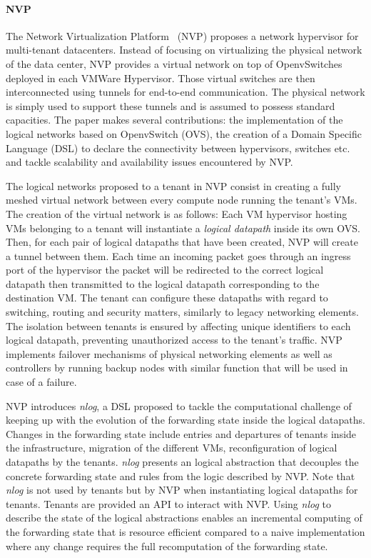 \paragraph{NVP}
The Network Virtualization Platform~\cite{NVP-Koponen2014} (NVP) proposes a network hypervisor for multi-tenant datacenters. Instead of focusing on virtualizing the physical network of the data center, NVP provides a virtual network on top of OpenvSwitches~\cite{openvswitch} deployed in each VMWare Hypervisor. Those virtual switches are then interconnected using tunnels for end-to-end communication. 
The physical network is simply used to support these tunnels and is assumed to possess standard capacities.
The paper makes several contributions: the implementation of the logical networks based on OpenvSwitch (OVS), the creation of a Domain Specific Language (DSL) to declare the connectivity between hypervisors, switches etc. and tackle scalability and availability issues encountered by NVP.

The logical networks proposed to a tenant in NVP consist in creating a fully meshed virtual network between every compute node running the tenant's VMs.
The creation of the virtual network is as follows:
Each VM hypervisor hosting VMs belonging to a tenant will instantiate a \textit{logical datapath} inside its own OVS. 
Then, for each pair of logical datapaths that have been created, NVP will create a tunnel between them.
Each time an incoming packet goes through an ingress port of the hypervisor the packet will be redirected to the correct logical datapath then transmitted to the logical datapath corresponding to the destination VM.
The tenant can configure these datapaths with regard to switching, routing and security matters, similarly to legacy networking elements.
The isolation between tenants is ensured by affecting unique identifiers to each logical datapath, preventing unauthorized access to the tenant's traffic.
NVP implements failover mechanisms of physical networking elements as well as controllers by running backup nodes with similar function that will be used in case of a failure.

NVP introduces \textit{nlog}, a DSL proposed to tackle the computational challenge of keeping up with the evolution of the forwarding state inside the logical datapaths. Changes in the forwarding state include entries and departures of tenants inside the infrastructure, migration of the different VMs, reconfiguration of logical datapaths by the tenants. \textit{nlog} presents an logical abstraction that decouples the concrete forwarding state and rules from the logic described by NVP. Note that \textit{nlog} is not used by tenants but by NVP when instantiating logical datapaths for tenants.
Tenants are provided an API to interact with NVP.
Using \textit{nlog} to describe the state of the logical abstractions enables an incremental computing of the forwarding state that is resource efficient compared to a naive implementation where any change requires the full recomputation of the forwarding state.

